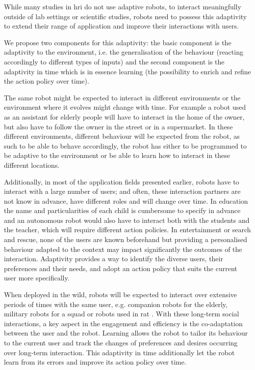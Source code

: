     While many studies in \gls{hri} do not use adaptive robots, to interact meaningfully outside of lab settings or scientific studies, robots need to possess this adaptivity to extend their range of application and improve their interactions with users.  
    
    We propose two components for this adaptivity: the basic component is the adaptivity to the environment, i.e. the generalisation of the behaviour (reacting accordingly to different types of inputs) and the second component is the adaptivity in time which is in essence learning (the possibility to enrich and refine the action policy over time). 
	
    The same robot might be expected to interact in different environments or the environment where it evolves might change with time. For example a robot used as an assistant for elderly people will have to interact in the home of the owner, but also have to follow the owner in the street or in a supermarket. In these different environments, different behaviour will be expected from the robot, as such to be able to behave accordingly, the robot has either to be programmed to be adaptive to the environment or be able to learn how to interact in these different locations.

    Additionally, in most of the application fields presented earlier, robots have to interact with a large number of users; and often, these interaction partners are not know in advance, have different roles and will change over time. In education the name and particularities of each child is cumbersome to specify in advance and an autonomous robot would also have to interact both with the students and the teacher, which will require different action policies. In entertainment or search and rescue, none of the users are known beforehand but providing a personalised behaviour adapted to the context may impact significantly the outcomes of the interaction. Adaptivity provides a way to identify the diverse users, their preferences and their needs, and adopt an action policy that suits the current user more specifically. %
    
    When deployed in the wild, robots will be expected to interact over extensive periods of times with the same user, e.g. companion robots for the elderly, military robots for a squad or robots used in \gls{rat} \citep{leite2013social}. With these long-term social interactions, a key aspect in the engagement and efficiency is  the co-adaptation between the user and the robot. Learning allows the robot to tailor its behaviour to the current user and track the changes of preferences and desires occurring over long-term interaction. This adaptivity in time additionally let the robot learn from its errors and improve its action policy over time. 

